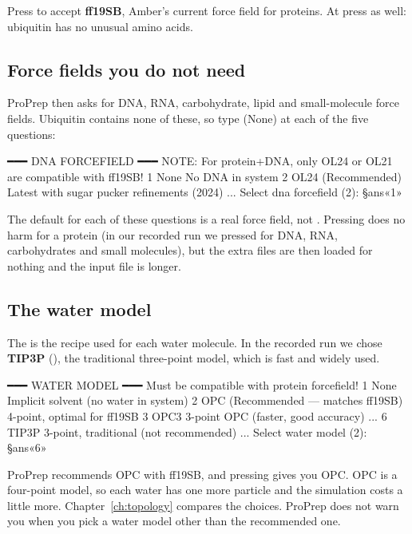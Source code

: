 Press  to accept \textbf{ff19SB}, Amber's current force field for
proteins. At  press  as well:
ubiquitin has no unusual amino acids.

\subsection{Force fields you do not need}

ProPrep then asks for DNA, RNA, carbohydrate, lipid and small-molecule force
fields. Ubiquitin contains none of these, so type  (None) at each of the
five questions:

\begin{screen}
━━━ DNA FORCEFIELD ━━━
NOTE: For protein+DNA, only OL24 or OL21 are compatible with ff19SB!
  1    None                  No DNA in system
  2    OL24 (Recommended)    Latest with sugar pucker refinements (2024)
...
Select dna forcefield (2): §ans«1»
\end{screen}

\begin{tip}
The default for each of these questions is a real force field, not
. Pressing  does no harm for a protein (in our recorded
run we pressed  for DNA, RNA, carbohydrates and small molecules), but
the extra files are then loaded for nothing and the input file is longer.
\end{tip}

\subsection{The water model}

The  is the recipe used for each water molecule. In the
recorded run we chose \textbf{TIP3P} (), the traditional three-point
model, which is fast and widely used.

\begin{screen}
━━━ WATER MODEL ━━━
Must be compatible with protein forcefield!
  1     None                                  Implicit solvent (no water in system)
  2     OPC (Recommended — matches ff19SB)    4-point, optimal for ff19SB
  3     OPC3                                  3-point OPC (faster, good accuracy)
...
  6     TIP3P                                 3-point, traditional (not recommended)
...
Select water model (2): §ans«6»
\end{screen}

ProPrep recommends OPC with ff19SB, and pressing  gives you OPC.
OPC is a four-point model, so each water has one more particle and the
simulation costs a little more. Chapter~\ref{ch:topology} compares the
choices. ProPrep does not warn you when you pick a water model other than the
recommended one.

